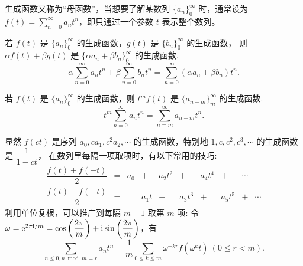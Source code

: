 生成函数又称为“母函数”，当想要了解某数列 $\{a_n\}_0^{\infty}$ 时，通常设为
$\displaystyle f(t)=\sum_{n=0}^{\infty}a_nt^n$，即只通过一个参数 $t$ 表示整个数列。

\begin{theorem}[加法性质]
    若 $f(t)$ 是 $\{a_n\}_0^{\infty}$ 的生成函数，$g(t)$ 是 $\{b_n\}_0^{\infty}$ 的生成函数，
    则 $\alpha f(t)+\beta g(t)$ 是 $\{\alpha a_n+\beta b_n\}_0^{\infty}$ 的生成函数.
    $$\alpha\sum_{n=0}^{\infty}a_nt^n+\beta\sum_{n=0}^{\infty}b_nt^n=\sum_{n=0}^{\infty}(\alpha a_n+\beta b_n)t^n.$$
\end{theorem}
\begin{theorem}[移位性质]
    若 $f(t)$ 是 $\{a_n\}_0^{\infty}$ 的生成函数，则 $t^mf(t)$ 是 $\{a_{n-m}\}_m^{\infty}$ 的生成函数.
    $$t^m\sum_{n=0}^{\infty}a_nt^n=\sum_{n=m}^{\infty}a_{n-m}t^n.$$
\end{theorem}
\begin{theorem}[变换性质]
    显然 $f(ct)$ 是序列 $a_0,ca_1,c^2a_2,\cdots$ 的生成函数，特别地 $1,c,c^2,c^3,\cdots$ 的生成函数是 $\dfrac{1}{1-ct}$，
    在数列里每隔一项取项时，有以下常用的技巧:
    $$\begin{matrix}
            \dfrac{f(t)+f(-t)}{2} & = & a_0 & +    & a_2t^2 & +      & a_4t^4 & +      & \cdots &        \\
            \dfrac{f(t)-f(-t)}{2} & = &     & a_1t & +      & a_3t^3 & +      & a_5t^5 & +      & \cdots
        \end{matrix}$$
    利用单位复根，可以推广到每隔 $m-1$ 取第 $m$ 项: 令 $\omega=\mathrm{e} ^{2\pi\mathrm{i}/m}=\cos\left(\dfrac{2\pi}{m}\right)+\mathrm{i}\sin\left(\dfrac{2\pi}{m}\right)$，有
    $$\sum_{n\leqslant 0,n\bmod m=r}a_nt^n=\dfrac{1}{m}\sum_{0\leqslant k\leqslant m}\omega^{-kr}f\left(\omega^kt\right)~  (0\leqslant r<m).$$
\end{theorem}

